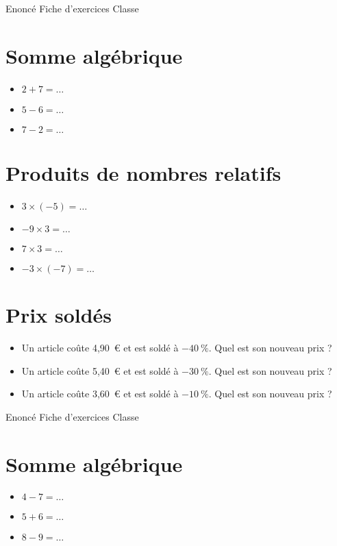 \documentclass[a4paper,11pt,fleqn]{article}
\begin{document}
\pagestyle{empty}


{Enoncé} \hfill {\huge Fiche d'exercices } \hfill {Classe}

\section{Somme algébrique}
\begin{itemize}

  \item $2 +7=\ldots$
  \item $5 -6=\ldots$
  \item $7 -2=\ldots$
\end{itemize}


\section{Produits de nombres relatifs}
\begin{itemize}

  \item $3\times(-5)=\ldots$
  \item $-9\times3=\ldots$
  \item $7\times3=\ldots$
  \item $-3\times(-7)=\ldots$
\end{itemize}


\section{Prix soldés}
\begin{itemize}

  \item Un article coûte 4,90~€ et est soldé à $-40~\%$. Quel est son nouveau prix ?
  \item Un article coûte 5,40~€ et est soldé à $-30~\%$. Quel est son nouveau prix ?
  \item Un article coûte 3,60~€ et est soldé à $-10~\%$. Quel est son nouveau prix ?
\end{itemize}
\newpage
\setcounter{exo}{0}
\setcounter{section}{0}
{Enoncé} \hfill {\huge Fiche d'exercices } \hfill {Classe}

\section{Somme algébrique}
\begin{itemize}

  \item $4 -7=\ldots$
  \item $5 +6=\ldots$
  \item $8 -9=\ldots$
\end{itemize}
\end{document}
